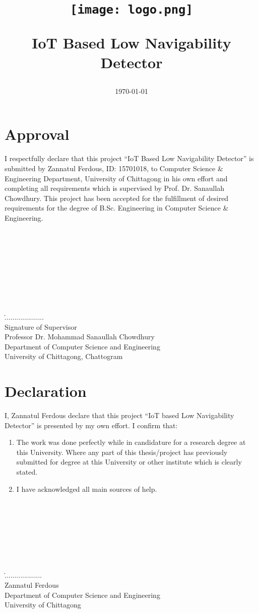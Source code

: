 \documentclass[12pt, top = 1 inch, bottom = 1 inch, left = 1.2 inch, top = .8 inch]{book}
\title{
	\begin{figure}
		\centering
		\texttt{[image: logo.png]}
	\end{figure}
	{\Large{IoT Based Low Navigability Detector}\\}	
	\centering{\author{Zannatul Ferdous\\
			ID: 15701018\\
			Supervised by\\
			
			Professor Dr. Mohammad Sanaullah Chowdhury\\
			Submitted to:\\
			Department of Computer Science and Engineering\\
			University of Chittagong\\} }
	\date{\today}}
\begin{document}
	\maketitle
 	\setcounter{page}{1}
	\section*{Approval}
	I respectfully declare that this project “IoT Based Low Navigability Detector” is submitted by Zannatul Ferdous, ID: 15701018, to Computer Science \& Engineering Department, University of Chittagong in his own effort and completing all requirements which is supervised by Prof. Dr. Sanaullah Chowdhury. This project has been accepted for the fulfillment of desired requirements for the degree of B.Sc. Engineering in Computer Science \& Engineering.\\\\\\\\\\\\\\\\\\\\
	\.....................\\
	Signature of Supervisor\\
	Professor Dr. Mohammad Sanaullah Chowdhury\\
	Department of Computer Science and Engineering\\
	University of Chittagong, Chattogram\\
	\newpage
	\section*{Declaration}
	I, Zannatul Ferdous declare that this project “IoT based Low Navigability Detector” is presented by my own effort. I confirm that:
	\begin{enumerate}
		\item The work was done perfectly while in candidature for a research degree at this University. Where any part of this thesis/project has previously submitted for degree at this University or other institute which is clearly stated.
		\item I have acknowledged all main sources of help.\\\\\\\\\\\\\\\\
	\end{enumerate}
	\....................\\
	Zannatul Ferdous\\
	Department of Computer Science and Engineering\\
	University of Chittagong\\
	\newpage
\end{document}
